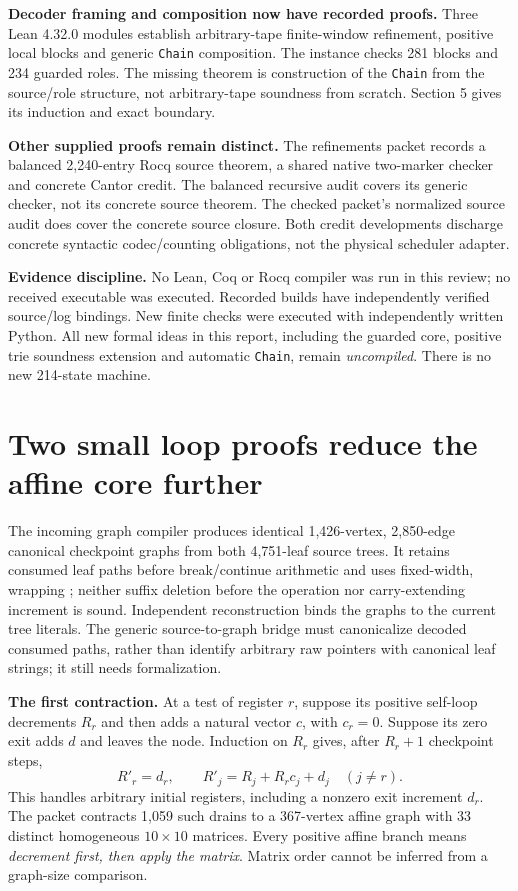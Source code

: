\documentclass[11pt]{article}
\newcommand{\file}[1]{{\small\path{#1}}}
\newcommand{\code}[1]{\texttt{#1}}
\begin{document}
\textbf{Decoder framing and composition now have recorded proofs.} Three Lean 4.32.0 modules establish arbitrary-tape finite-window refinement, positive local blocks and generic \code{Chain} composition. The instance checks 281 blocks and 234 guarded roles. The missing theorem is construction of the \code{Chain} from the source/role structure, not arbitrary-tape soundness from scratch. Section 5 gives its induction and exact boundary.

\textbf{Other supplied proofs remain distinct.} The refinements packet records a balanced 2,240-entry Rocq source theorem, a shared native two-marker checker and concrete Cantor credit. The balanced recursive audit covers its generic checker, not its concrete source theorem. The checked packet's normalized source audit does cover the concrete source closure. Both credit developments discharge concrete syntactic codec/counting obligations, not the physical scheduler adapter.

\textbf{Evidence discipline.} No Lean, Coq or Rocq compiler was run in this review; no received executable was executed. Recorded builds have independently verified source/log bindings. New finite checks were executed with independently written Python. All new formal ideas in this report, including the guarded core, positive trie soundness extension and automatic \code{Chain}, remain \emph{uncompiled}. There is no new 214-state machine.

\newpage
\section{Two small loop proofs reduce the affine core further}
The incoming graph compiler produces identical 1,426-vertex, 2,850-edge canonical checkpoint graphs from both 4,751-leaf source trees. It retains consumed leaf paths before break/continue arithmetic and uses fixed-width, wrapping \file{incPath}; neither suffix deletion before the operation nor carry-extending increment is sound. Independent reconstruction binds the graphs to the current tree literals. The generic source-to-graph bridge must canonicalize decoded consumed paths, rather than identify arbitrary raw pointers with canonical leaf strings; it still needs formalization.

\textbf{The first contraction.} At a test of register $r$, suppose its positive self-loop decrements $R_r$ and then adds a natural vector $c$, with $c_r=0$. Suppose its zero exit adds $d$ and leaves the node. Induction on $R_r$ gives, after $R_r+1$ checkpoint steps,
\[
 R'_r=d_r,\qquad R'_j=R_j+R_r c_j+d_j\quad(j\ne r).
\]
This handles arbitrary initial registers, including a nonzero exit increment $d_r$. The packet contracts 1,059 such drains to a 367-vertex affine graph with 33 distinct homogeneous $10\times10$ matrices. Every positive affine branch means \emph{decrement first, then apply the matrix}. Matrix order cannot be inferred from a graph-size comparison.
\end{document}
